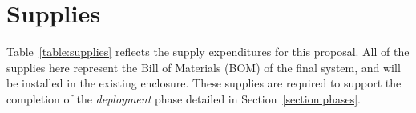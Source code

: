 \documentclass[12pt]{article}
\begin{document}
{%
%
%
%

%
%
\section{Supplies}
\label{section:supplies}
Table~\ref{table:supplies} reflects the supply expenditures for this proposal. All of the supplies here represent the Bill of Materials (BOM) of the final system, and will be installed in the existing enclosure. These supplies are required to support the completion of the \textit{deployment} phase detailed in Section~\ref{section:phases}.\\

}
\end{document}
